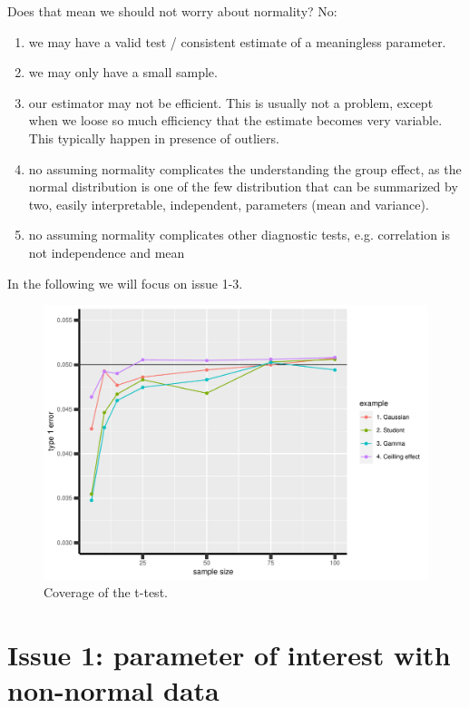 \documentclass[12pt]{article}
\begin{document}
\clearpage

Does that mean we should not worry about normality? No:
\begin{enumerate}
\item we may have a valid test / consistent estimate of a meaningless
parameter.
\item we may only have a small sample.
\item our estimator may not be efficient. This is usually not a problem,
except when we loose so much efficiency that the estimate becomes
very variable. This typically happen in presence of outliers.
\item no assuming normality complicates the understanding the group
effect, as the normal distribution is one of the few distribution
that can be summarized by two, easily interpretable, independent,
parameters (mean and variance).
\item no assuming normality complicates other diagnostic tests, e.g.
correlation is not independence and mean
\end{enumerate}
In the following we will focus on issue 1-3.

\begin{figure}[!h]
\centering
\includegraphics[width=\textwidth]{./figures/examples-coverage.pdf}
\caption{\label{fig:coverage}Coverage of the t-test.}
\end{figure}



\clearpage

\section{Issue 1: parameter of interest with non-normal data}
\label{sec:org6ae3e82}
\end{document}
